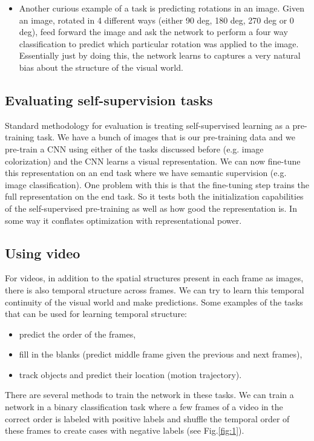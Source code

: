 \begin{itemize}
\item Another curious example of a task is predicting rotations in an image. Given an image, rotated in 4 different ways (either 90 deg, 180 deg, 270 deg or 0 deg), feed forward the image and ask the network to perform a four way classification to predict which particular rotation was applied to the image. Essentially just by doing this, the network learns to captures a very natural bias about the structure of the visual world.
\end{itemize}{}

\subsection{Evaluating self-supervision tasks}
Standard methodology for evaluation is treating self-supervised learning as a pre-training task. We have a bunch of images that is our pre-training data and we pre-train a CNN using either of the tasks discussed before (e.g. image colorization) and the CNN learns a visual representation. We can now fine-tune this representation on an end task where we have semantic supervision (e.g. image classification). One problem with this is that the fine-tuning step trains the full representation on the end task. So it tests both the initialization capabilities of the self-supervised pre-training as well as how good the representation is. In some way it conflates optimization with representational power.

\subsection{Using video}
For videos, in addition to the spatial structures present in each frame as images, there is also temporal structure across frames.
We can try to learn this temporal continuity of the visual world and make predictions. 
Some examples of the tasks that can be used for learning temporal structure:

\begin{itemize}
\item predict the order of the frames,
\item fill in the blanks (predict middle frame given the previous and next frames),
\item track objects and predict their location (motion trajectory).
\end{itemize}

There are several methods to train the network in these tasks.
We can train a network in a binary classification task where a few frames of a video in the correct order is labeled with positive labels and shuffle the temporal order of these frames to create cases with negative labels (see Fig.\ref{fig:1}). 

